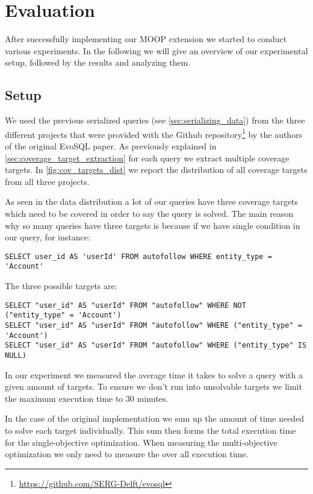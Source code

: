 \chapter{Evaluation}
\label{cha:evaluation}

After successfully implementing our MOOP extension we started to conduct various experiments. In the following we will give an overview of our experimental setup, followed by the results and analyzing them.

\section{Setup}
\label{sec:experimental_setup}
We used the previous serialized queries (see \cref{sec:serializing_data}) from the three different projects that were provided with the Github repository\footnote[2]{\href{https://github.com/SERG-Delft/evosql}{https://github.com/SERG-Delft/evosql}} by the authors of the original EvoSQL paper. As previously explained in \cref{sec:coverage_target_extraction} for each query we extract multiple coverage targets. In \cref{fig:cov_targets_dist} we report the distribution of all coverage targets from all three projects.

As seen in the data distribution a lot of our queries have three coverage targets which need to be covered in order to say the query is solved. The main reason why so many queries have three targets is because if we have single condition in our query, for instance:
\begin{verbatim}
SELECT user_id AS 'userId' FROM autofollow WHERE entity_type = 'Account'
\end{verbatim}

The three possible targets are:
\begin{verbatim}
SELECT "user_id" AS "userId" FROM "autofollow" WHERE NOT ("entity_type" = 'Account')
SELECT "user_id" AS "userId" FROM "autofollow" WHERE ("entity_type" = 'Account')
SELECT "user_id" AS "userId" FROM "autofollow" WHERE ("entity_type" IS NULL)
\end{verbatim}

In our experiment we measured the average time it takes to solve a query with a given amount of targets. To ensure we don't run into unsolvable targets we limit the maximum execution time to 30 minutes.

In the case of the original implementation we sum up the amount of time needed to solve each target individually. This sum then forms the total execution time for the single-objective optimization. When measuring the multi-objective optimization we only need to measure the over all execution time.

